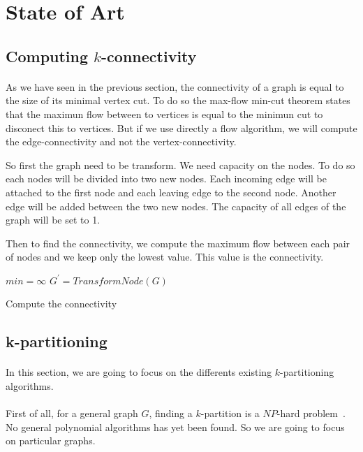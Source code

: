 \section{State of Art}
\subsection{Computing $k$-connectivity}
\paragraph{}
As we have seen in the previous section, the connectivity of a graph is equal to
the size of its minimal vertex cut.
To do so the max-flow min-cut theorem states that the maximun flow between to
vertices is equal to the minimun cut to disconect this to vertices.
But if we use directly a flow algorithm, we will compute the edge-connectivity
and not the vertex-connectivity.

So first the graph need to be transform. We need capacity on the nodes. To do so
each nodes will be divided into two new nodes. Each incoming edge will be
attached to the first node and each leaving edge to the second node. Another
edge will be added between the two new nodes.
The capacity of all edges of the graph will be set to 1.

Then to find the connectivity, we compute the maximum flow between each pair of
nodes and we keep only the lowest value. This value is the connectivity.


\begin{algorithm}[!h]
    $min = \infty$\;
    $G^{'} = TransformNode(G)$\;
    \;
    \caption{Compute the connectivity}
\end{algorithm}

\subsection{k-partitioning}
\paragraph{}
In this section, we are going to focus on the differents existing
$k$-partitioning algorithms.

\paragraph{}
First of all, for a general graph $G$, finding a $k$-partition is a $NP$-hard
problem~\cite{Dyer1985139}. No general polynomial algorithms has yet been found.
So we are going to focus on particular graphs.

